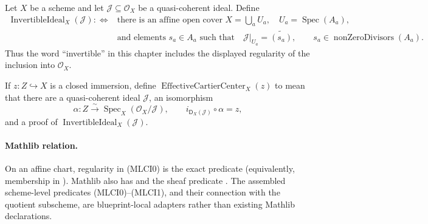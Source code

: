 \begin{definition}
  \label{def:nagata-invertible-ideal-effective-cartier}
  \leanok

  Let $X$ be a scheme and let
  $\mathcal J\subseteq\mathcal O_X$ be a quasi-coherent ideal.  Define
  \[
  \begin{aligned}
    \operatorname{InvertibleIdeal}_X(\mathcal J)
      :\Longleftrightarrow{}&
      \text{there is an affine open cover }X=\bigcup_aU_a,\quad
      U_a=\operatorname{Spec}(A_a),\\
      &\text{and elements }s_a\in A_a\text{ such that}\quad
      \mathcal J|_{U_a}=\widetilde{(s_a)},\qquad
      s_a\in\operatorname{nonZeroDivisors}(A_a).
  \end{aligned}                                                   \tag{MLCI0}
  \]
  Thus the word ``invertible'' in this chapter includes the displayed
  regularity of the inclusion into $\mathcal O_X$.

  If $z\colon Z\hookrightarrow X$ is a closed immersion, define
  \(\operatorname{EffectiveCartierCenter}_X(z)\) to mean that there are a
  quasi-coherent ideal $\mathcal J$, an isomorphism
  \[
    \alpha\colon
      Z\xrightarrow{\sim}
      \operatorname{Spec}_X(\mathcal O_X/\mathcal J),
    \qquad
    i_{\mathsf D_X(\mathcal J)}\circ\alpha=z,                    \tag{MLCI1}
  \]
  and a proof of
  $\operatorname{InvertibleIdeal}_X(\mathcal J)$.

  \paragraph{Mathlib relation.}
  On an affine chart, regularity in (MLCI0) is the exact predicate
  \texttt{} (equivalently, membership in
  \texttt{}).  Mathlib also has
  \texttt{} and the sheaf predicate
  \texttt{}.  The assembled
  scheme-level predicates (MLCI0)--(MLCI1), and their connection with the
  quotient subscheme, are blueprint-local adapters rather than existing
  Mathlib declarations.


\end{definition}
